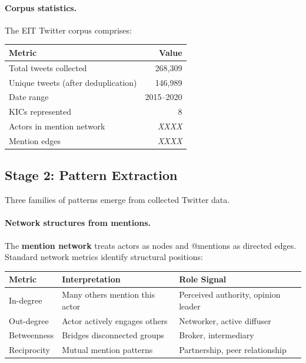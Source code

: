 \documentclass[../main.tex]{subfiles}
\begin{document}
\paragraph{Corpus statistics.}
The EIT Twitter corpus comprises:

\tableminimal
\begin{center}
\begin{tabular}{@{}lr@{}}
\toprule
\textbf{Metric} & \textbf{Value} \\
\midrule
Total tweets collected & 268,309 \\
Unique tweets (after deduplication) & 146,989 \\
Date range & 2015--2020 \\
KICs represented & 8 \\
Actors in mention network & \textit{XXXX} \\
Mention edges & \textit{XXXX} \\
\bottomrule
\end{tabular}
\end{center}

\subsection{Stage 2: Pattern Extraction}

Three families of patterns emerge from collected Twitter data.

\paragraph{Network structures from mentions.}
The \textbf{mention network} treats actors as nodes and @mentions as directed edges.
Standard network metrics identify structural positions:

\tableminimal
\begin{center}
\begin{tabular}{@{}p{2.5cm}p{4cm}p{5cm}@{}}
\toprule
\textbf{Metric} & \textbf{Interpretation} & \textbf{Role Signal} \\
\midrule
In-degree & Many others mention this actor & Perceived authority, opinion leader \\
Out-degree & Actor actively engages others & Networker, active diffuser \\
Betweenness & Bridges disconnected groups & Broker, intermediary \\
Reciprocity & Mutual mention patterns & Partnership, peer relationship \\
\bottomrule
\end{tabular}
\end{center}
\end{document}
